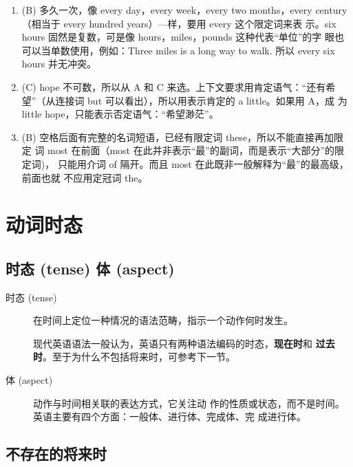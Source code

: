 \begin{enumerate}
\item (B) 多久一次，像 every day，every week，every two months，every
  century（相当于 every hundred years）—样，要用 every 这个限定词来表
  示。six hours 固然是复数，可是像 hours，miles，pounds 这种代表“单位”的字
  眼也可以当单数使用，例如：Three miles is a long way to walk. 所以 every
  six hours 并无冲突。

\item (C) hope 不可数，所以从 A 和 C 来选。上下文要求用肯定语气：“还有希
  望”（从连接词 but 可以看出），所以用表示肯定的 a little。如果用 A，成
  为 little hope，只能表示否定语气：“希望渺茫”。


\item (B) 空格后面有完整的名词短语，已经有限定词 these，所以不能直接再加限定
  词 most 在前面（most 在此并非表示“最”的副词，而是表示“大部分”的限定词)，
  只能用介词 of 隔开。而且 most 在此既非一般解释为“最”的最高级，前面也就
  不应用定冠词 the。

\end{enumerate}

\chapter{动词时态}

\section{时态 (tense) 体 (aspect)}

\begin{description}
\item[时态 (tense)] 在时间上定位一种情况的语法范畴，指示一个动作何时发生。

  现代英语语法一般认为，英语只有两种语法编码的时态，\textbf{现在时}和
  \textbf{过去时}。至于为什么不包括将来时，可参考下一节。

\item[体 (aspect)] 动作与时间相关联的表达方式，它关注动
  作的性质或状态，而不是时间。英语主要有四个方面：一般体、进行体、完成体、完
  成进行体。
\end{description}

\section{不存在的将来时}

